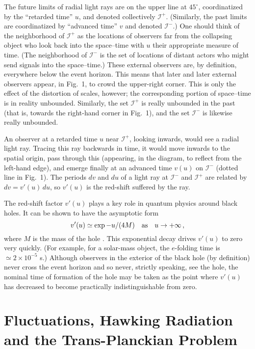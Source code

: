 \documentclass[12pt]{article}
\def\scrip{{\mathcal I}^-}
\def\scrif{{\mathcal I}^+}
\begin{document}
The future limits of radial light rays are on the upper line at $45^\circ$,
coordinatized by the ``retarded time'' $u$, and denoted collectively $\scrif$.
(Similarly, the past limits are coordinatized by ``advanced time'' $v$ and
denoted $\scrip$.) One should think of the neighborhood of $\scrif$ as the
locations of observers far from the collapsing object who look back into the
space--time with $u$ their appropriate measure of time. (The neighborhood of
$\scrip$ is the set of locations of distant actors who might send signals into
the space--time.) These external observers are, by definition, everywhere below
the event horizon.  This means that later and later external observers appear,
in Fig.~1, to crowd the upper-right corner.  This is only the effect of the
distortion of scales, however; the corresponding portion of space--time is in
reality unbounded. Similarly, the set $\scrif$ is really unbounded in the past
(that is, towards the right-hand corner in Fig.~1), and the set $\scrip$ is
likewise really unbounded.

An observer at a retarded time $u$ near $\scrif$, looking inwards, would see a
radial light ray.  Tracing this ray backwards in time, it would move inwards to
the spatial origin, pass through this (appearing, in the diagram, to reflect
from the left-hand edge), and emerge finally at an advanced time $v(u)$ on
$\scrip$ (dotted line in Fig.~1).  The periods $dv$ and $du$ of a light ray at
$\scrip$ and $\scrif$ are related by $dv=v'(u)\, du$, so $v'(u)$ is the
red-shift suffered by the ray.

The red-shift factor $v'(u)$ plays a key role in quantum physics around black
holes.  It can be shown to have the asymptotic form 
\begin{equation}
v'(u)\simeq \exp
-u/(4M)\quad\hbox{as}\quad u\to +\infty\, ,\label{eq:asympt}
\end{equation}
where $M$ is the mass of the hole \cite{MTW:1973,Helfer:2001}.  This
exponential decay drives $v'(u)$ to zero very quickly.  (For example, for a
solar-mass object, the $e$-folding time is $\simeq 2\times 10^{-5}$ s.)
Although observers in the exterior of the black hole (by definition) never
cross the event horizon and so never, strictly speaking, see the hole, the
nominal time of formation of the hole may be taken as the point where $v'(u)$
has decreased to become practically indistinguishable from zero.

\section{Fluctuations, 
Hawking Radiation\\ and the Trans-Planckian Problem}
\label{FHR}
\end{document}
